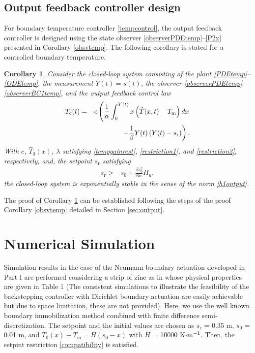 \documentclass[journal]{IEEEtran}
\newtheorem{coro}{Corollary}
\begin{document}
\subsection{Output feedback controller design}
For boundary temperature controller \eqref{tempcontrol}, the output feedback controller is designed using the state observer \eqref{observerPDEtemp}--\eqref{P2x} presented in Corollary \ref{obsvtemp}. The following corollary is stated for a controlled boundary temperature. 
\begin{coro}\label{outputthmtemp}
Consider the closed-loop system consisting of the plant \eqref{PDEtemp}--\eqref{ODEtemp}, the measurement $Y(t)=s(t)$, the observer \eqref{observerPDEtemp}-\eqref{observerBC1temp}, and the output feedback control law
\begin{align}\label{outctrtemp}
T_{{\mathrm c}}(t)=-c \left(\frac{1}{\alpha} \int_{0}^{Y(t)} x\left(\hat{T}(x,t)-T_{{\mathrm m}}\right) dx\right.\notag \\
\left. +\frac{1}{\beta}Y(t) \left(Y(t)-s_{{\mathrm r}}\right)\right). 
\end{align}
With  $c$, $\hat{T}_0(x)$, $\lambda$ satisfying \eqref{tempgainrest}, \eqref{restriction1}, and \eqref{restriction2}, respectively, and, the setpoint $s_{{\mathrm r}}$ satisfying  
\begin{align}
\label{restriction32} s_{{\mathrm r}}>&s_0+\frac{\beta s_0^2}{6\alpha } \hat{H}_{u}, 
\end{align}
the closed-loop system is exponentially stable in the sense of the norm \eqref{h1output}.
\end{coro}
The proof of Corollary \ref{outputthmtemp} can be established following the steps of the proof Corollary \ref{obsvtemp} detailed in Section \ref{sec:output}.
\section{Numerical Simulation}\label{simu}
Simulation results  in the case of the Neumann boundary actuation developed  in Part I are performed considering a strip of zinc as in \cite{maidi2014} whose physical properties are given in Table 1 (The consistent simulations to  illustrate  the feasibility of the backstepping controller with Dirichlet boundary actuation are easily achievable  but due to space limitation, these are not provided). Here, we use the well known boundary immobilization method combined with finite difference semi-discretization. The setpoint and the initial values are chosen as $s_{{\mathrm r}}$ = 0.35 m, $s_0$ = 0.01 m, and $T_0(x)-T_{{\mathrm m}}=H(s_{0}-x)$ with $H$ = 10000 K$\cdot {\rm m}^{-1}$. Then, the setpint restriction \eqref{compatibility} is satisfied. 
\end{document}
